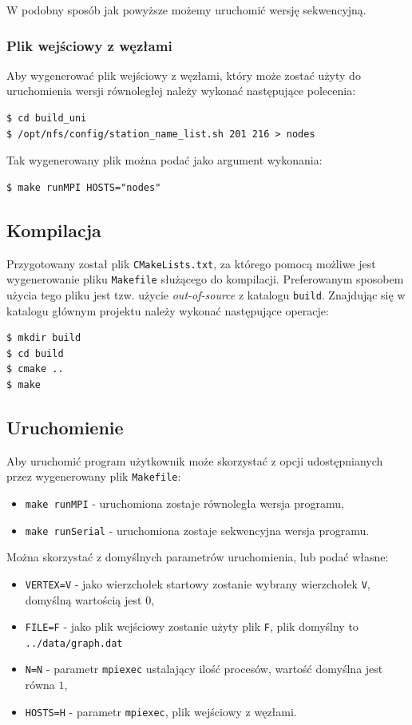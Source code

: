 \documentclass[12pt]{article}
\begin{document}
\noindent
W podobny sposób jak powyższe możemy uruchomić wersję sekwencyjną.

\subsubsection{Plik wejściowy z węzłami}

Aby wygenerować plik wejściowy z węzłami, który może zostać użyty do uruchomienia wersji równoległej należy wykonać następujące polecenia:
\begin{lstlisting}
$ cd build_uni
$ /opt/nfs/config/station_name_list.sh 201 216 > nodes
\end{lstlisting}

\noindent
Tak wygenerowany plik można podać jako argument wykonania:
\begin{lstlisting}
$ make runMPI HOSTS="nodes"
\end{lstlisting}


\subsection{Kompilacja}
 Przygotowany został plik \lstinline|CMakeLists.txt|, za którego pomocą możliwe jest wygenerowanie pliku \lstinline{Makefile} służącego do kompilacji. Preferowanym sposobem użycia tego pliku jest tzw. użycie \textit{out-of-source} z katalogu \lstinline{build}. Znajdując się w katalogu głównym projektu należy wykonać następujące operacje:
\begin{lstlisting}
$ mkdir build
$ cd build
$ cmake ..
$ make
\end{lstlisting}

\subsection{Uruchomienie} \label{sec:uru}

Aby uruchomić program użytkownik może skorzystać z opcji udostępnianych przez wygenerowany plik \lstinline|Makefile|:
\begin{itemize}
\item  \lstinline|make runMPI| - uruchomiona zostaje równoległa wersja programu,
\item  \lstinline|make runSerial| - uruchomiona zostaje sekwencyjna wersja programu.
\end{itemize}

\noindent
Można skorzystać z domyślnych parametrów uruchomienia, lub podać własne:
\begin{itemize}
\item  \lstinline|VERTEX=V| - jako wierzchołek startowy zostanie wybrany wierzchołek \lstinline|V|, domyślną wartością jest $0$,
\item  \lstinline|FILE=F| - jako plik wejściowy zostanie użyty plik \lstinline|F|, plik domyślny to \lstinline{../data/graph.dat}
\item  \lstinline|N=N| - parametr \lstinline|mpiexec| ustalający ilość procesów, wartość domyślna jest równa $1$,
\item  \lstinline|HOSTS=H| -  parametr \lstinline|mpiexec|, plik wejściowy z węzłami.
\end{itemize}
\end{document}
